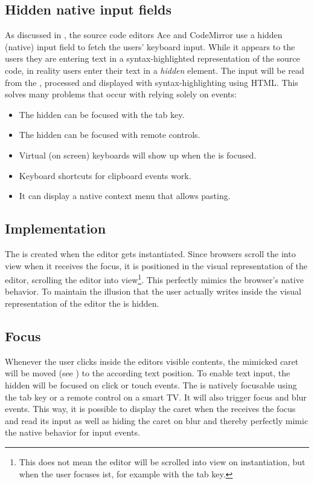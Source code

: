 \subsection{Hidden native input fields} 

\label{subsec:hidden_native_input_fields}

As discussed in , the source code editors Ace and CodeMirror use a hidden (native) input field to fetch the users' keyboard input. While it appears to the users they are entering text in a syntax-highlighted representation of the source code, in reality users enter their text in a \textit{hidden}  element. The input will be read from the , processed and displayed with syntax-highlighting using HTML. This solves many problems that occur with relying solely on events:

\begin{itemize}
\item The hidden  can be focused with the tab key.
\item The hidden  can be focused with remote controls.
\item Virtual (on screen) keyboards will show up when the  is focused.
\item Keyboard shortcuts for clipboard events work.
\item It can display a native context menu that allows pasting.
\end{itemize}

\subsection{Implementation}

The  is created when the editor gets instantiated. Since browsers scroll the  into view when it receives the focus, it is positioned in the visual representation of the editor, scrolling the editor into view\footnote{This does not mean the editor will be scrolled into view on instantiation, but when the user focuses ist, for example with the tab key.}. This perfectly mimics the browser's native behavior. To maintain the illusion that the user actually writes inside the visual representation of the editor the  is hidden.

\subsection{Focus} Whenever the user clicks inside the editors visible contents, the mimicked caret will be moved (see ) to the according text position. To enable text input, the hidden  will be focused on click or touch events. The  is natively focusable using the tab key or a remote control on a smart TV. It will also trigger focus and blur events. This way, it is possible to display the caret when the  receives the focus and read its input as well as hiding the caret on blur and thereby perfectly mimic the native behavior for input events.

